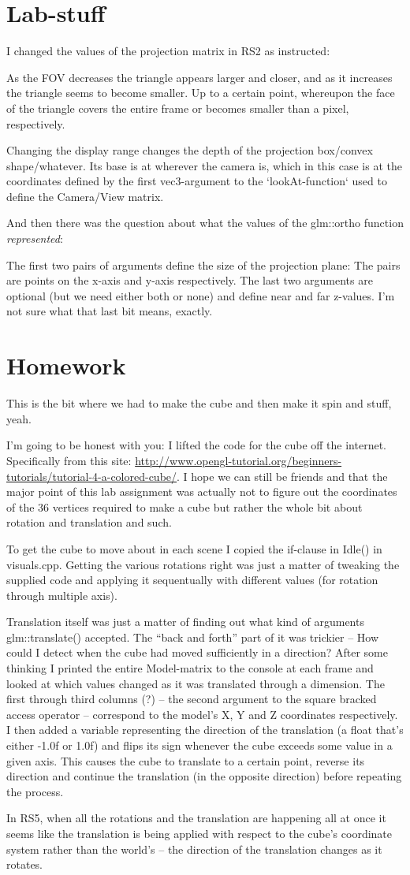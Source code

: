 \section{Lab-stuff}
I changed the values of the projection matrix in RS2 as instructed:

As the FOV decreases the triangle appears larger and closer, and as it increases the triangle seems to become smaller.
Up to a certain point, whereupon the face of the triangle covers the entire frame or becomes smaller than a pixel, respectively.

Changing the display range changes the depth of the projection box/convex shape/whatever.
Its base is at wherever the camera is, which in this case is at the coordinates defined by the first vec3-argument to the `lookAt-function` used to define the Camera/View matrix.

And then there was the question about what the values of the glm::ortho function \textit{represented}:

The first two pairs of arguments define the size of the projection plane: The pairs are points on the x-axis and y-axis respectively.
The last two arguments are optional (but we need either both or none) and define near and far z-values.
I'm not sure what that last bit means, exactly.

\section{Homework}
This is the bit where we had to make the cube and then make it spin and stuff, yeah.

I'm going to be honest with you: I lifted the code for the cube off the internet.
Specifically from this site: \url{http://www.opengl-tutorial.org/beginners-tutorials/tutorial-4-a-colored-cube/}.
I hope we can still be friends and that the major point of this lab assignment was actually not to figure out the coordinates of the 36 vertices required to make a cube but rather the whole bit about rotation and translation and such.

To get the cube to move about in each scene I copied the if-clause in Idle() in visuals.cpp.
Getting the various rotations right was just a matter of tweaking the supplied code and applying it sequentually with different values (for rotation through multiple axis).

Translation itself was just a matter of finding out what kind of arguments glm::translate() accepted.
The ``back and forth'' part of it was trickier -- How could I detect when the cube had moved sufficiently in a direction?
After some thinking I printed the entire Model-matrix to the console at each frame and looked at which values changed as it was translated through a dimension.
The first through third columns (?) -- the second argument to the square bracked access operator -- correspond to the model's X, Y and Z coordinates respectively.
I then added a variable representing the direction of the translation (a float that's either -1.0f or 1.0f) and flips its sign whenever the cube exceeds some value in a given axis.
This causes the cube to translate to a certain point, reverse its direction and continue the translation (in the opposite direction) before repeating the process.

In RS5, when all the rotations and the translation are happening all at once it seems like the translation is being applied with respect to the cube's coordinate system rather than the world's -- the direction of the translation changes as it rotates.
